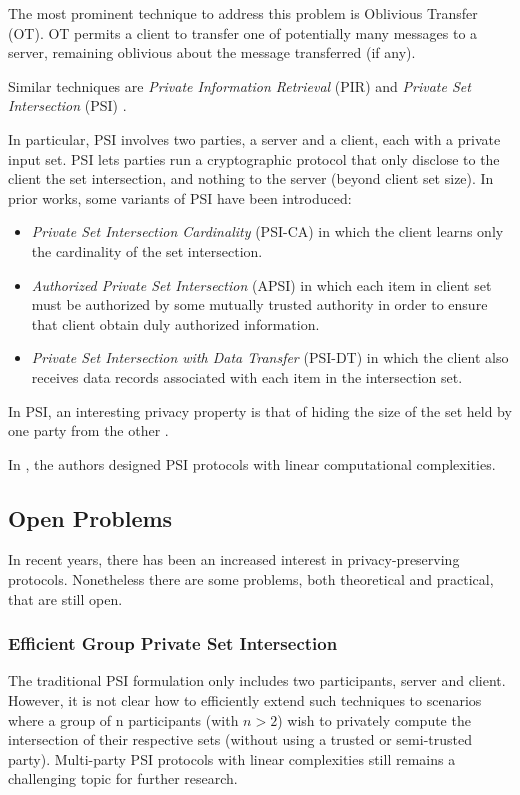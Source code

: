 \documentclass[dvips,12pt]{article}
\begin{document}
The most prominent technique to address this problem is Oblivious Transfer (OT)\cite{oblivious}.
OT permits a client to transfer one of potentially many messages to a server, remaining oblivious about the message transferred (if any).

Similar techniques are \emph{Private Information Retrieval} (PIR) \cite{pir} and \emph{Private Set Intersection} (PSI) \cite{psi}. 

In particular, PSI involves two parties, a server and a client, each with a private input set. PSI
lets parties run a cryptographic protocol that only disclose to the client the set intersection, and
nothing to the server (beyond client set size).
In prior works, some variants of PSI have been introduced:
\begin{itemize}
\item \emph{Private Set Intersection Cardinality} (PSI-CA) in which the client learns only the cardinality of the set intersection.
\item \emph{Authorized Private Set Intersection} (APSI) in which each item in client set must be authorized by some mutually trusted authority in order to ensure that client obtain duly authorized information.
\item \emph{Private Set Intersection with Data Transfer} (PSI-DT) in which the client also receives data records associated with each item in the intersection set.
\end{itemize}

In PSI, an interesting privacy property is that of hiding the size of the set held by one party from the other \cite{size-psi}.

In \cite{lin-psi,linear-psi}, the authors designed PSI protocols with linear computational complexities.

\subsection{Open Problems}
In recent years, there has been an increased interest in privacy-preserving protocols. 
Nonetheless there are some problems, both theoretical and practical, that are still open.
\subsubsection{Efficient Group Private Set Intersection}
The traditional PSI formulation only includes two participants, server and client. However, it is not clear how to efficiently extend such techniques to scenarios where a group of n participants (with $n > 2$) wish to privately compute the intersection of their respective sets (without using a trusted or semi-trusted party). Multi-party PSI protocols with linear complexities still remains a challenging topic for further research.
\end{document}
